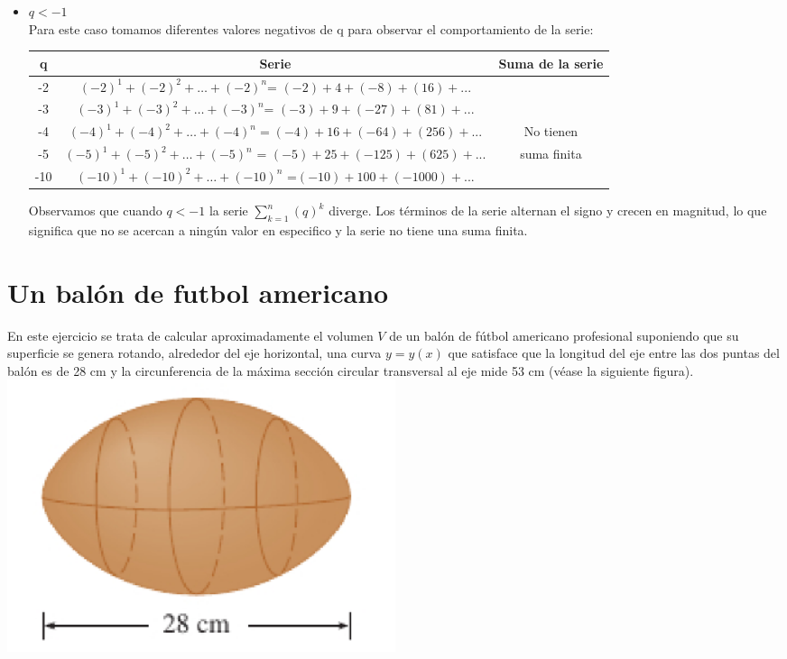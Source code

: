 \documentclass[12pt]{article}
\begin{document}
\begin{enumerate}
\begin{itemize}
    \item $q<-1$
\\
Para este caso tomamos diferentes valores negativos de q para observar el comportamiento de la serie:
   \begin{table} [H]
    \centering   
\begin{tabular}{| c | c | c |}
\hline
q &     Serie & Suma de la serie  \\ \hline
-2 &  $(-2)^1 + (-2)^2 +\ldots+(-2)^n$= $(-2) +4 + (-8) +(16)+ ...$ & \\ 
 -3 &  $(-3)^1 + (-3)^2 +\ldots+(-3)^n$=    $(-3) +9 + (-27) +(81)+ ...$ &\\ 
 -4& $(-4)^1 + (-4)^2 +\ldots+(-4)^n =(-4) +16 + (-64) +(256)+ ...$  &  No tienen     \\
 -5 & $(-5)^1 + (-5)^2 +\ldots+(-5)^n$ = $(-5) +25 + (-125) +(625)+ ...$ &  suma finita   \\ 
-10 &$(-10)^1 + (-10)^2 +\ldots+(-10)^n$ =$(-10) +100 + (-1000)+ ...$  &    \\ \hline
\end{tabular}

\label{tab:datos}

\end{table}
Observamos que cuando $q<-1$ la serie $\sum_{k=1}^{n} (q)^k $ diverge. Los términos de la serie alternan el signo y crecen en magnitud, lo que significa que no se acercan a ningún valor en especifico y la serie no tiene una suma finita.
    
\end{itemize}
\end{enumerate}
 \section{\large Un balón de futbol americano} 
 En este ejercicio se trata de calcular aproximadamente el volumen \( V \) de un balón de fútbol americano profesional suponiendo que su superficie se genera rotando, alrededor del eje horizontal, una curva \( y = y(x) \) que satisface que la longitud del eje entre las dos puntas del balón es de 28 cm y la circunferencia de la máxima sección circular transversal al eje mide 53 cm (véase la siguiente figura).\\
    \includegraphics[width=0.5\textwidth, center]{balon.png}
\end{document}
